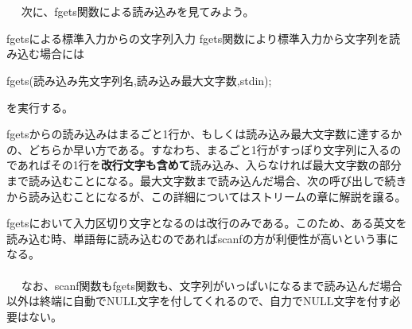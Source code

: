 \\ \\　
次に、fgets関数による読み込みを見てみよう。
\begin{itembox}[l]{fgetsによる標準入力からの文字列入力}
fgets関数により標準入力から文字列を読み込む場合には
\begin{code}
fgets(読み込み先文字列名,読み込み最大文字数,stdin);
\end{code}
を実行する。
\end{itembox}

fgetsからの読み込みはまるごと1行か、もしくは読み込み最大文字数に達するかの、どちらか早い方である。すなわち、まるごと1行がすっぽり文字列に入るのであればその1行を\textbf{改行文字も含めて}読み込み、入らなければ最大文字数の部分まで読み込むことになる。最大文字数まで読み込んだ場合、次の呼び出しで続きから読み込むことになるが、この詳細についてはストリームの章に解説を譲る。

fgetsにおいて入力区切り文字となるのは改行のみである。このため、ある英文を読み込む時、単語毎に読み込むのであればscanfの方が利便性が高いという事になる。
\\ \\　
なお、scanf関数もfgets関数も、文字列がいっぱいになるまで読み込んだ場合以外は終端に自動でNULL文字を付してくれるので、自力でNULL文字を付す必要はない。

